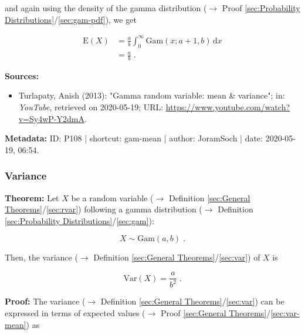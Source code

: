\documentclass[a4paper,12pt,twoside]{book}
\begin{document}
and again using the density of the gamma distribution ($\rightarrow$ Proof \ref{sec:Probability Distributions}/\ref{sec:gam-pdf}), we get

\begin{equation} \label{eq:gam-mean-gam-mean-s3}
\begin{split}
\mathrm{E}(X) &= \frac{a}{b} \int_{0}^{\infty} \mathrm{Gam}(x; a+1, b) \, \mathrm{d}x \\
&= \frac{a}{b} \; .
\end{split}
\end{equation}


\vspace{1em}
\textbf{Sources:}
\begin{itemize}
\item Turlapaty, Anish (2013): "Gamma random variable: mean \& variance"; in: \textit{YouTube}, retrieved on 2020-05-19; URL: \url{https://www.youtube.com/watch?v=Sy4wP-Y2dmA}.
\end{itemize}


\vspace{1em}
\textbf{Metadata:} ID: P108 | shortcut: gam-mean | author: JoramSoch | date: 2020-05-19, 06:54.
\vspace{1em}



\subsubsection[\textbf{Variance}]{Variance} \label{sec:gam-var}
\setcounter{equation}{0}

\textbf{Theorem:} Let $X$ be a random variable ($\rightarrow$ Definition \ref{sec:General Theorems}/\ref{sec:rvar}) following a gamma distribution ($\rightarrow$ Definition \ref{sec:Probability Distributions}/\ref{sec:gam}):

\begin{equation} \label{eq:gam-var-gam}
X \sim \mathrm{Gam}(a, b) \; .
\end{equation}

Then, the variance ($\rightarrow$ Definition \ref{sec:General Theorems}/\ref{sec:var}) of $X$ is

\begin{equation} \label{eq:gam-var-gam-var}
\mathrm{Var}(X) = \frac{a}{b^2} \; .
\end{equation}


\vspace{1em}
\textbf{Proof:} The variance ($\rightarrow$ Definition \ref{sec:General Theorems}/\ref{sec:var}) can be expressed in terms of expected values ($\rightarrow$ Proof \ref{sec:General Theorems}/\ref{sec:var-mean}) as
\end{document}
